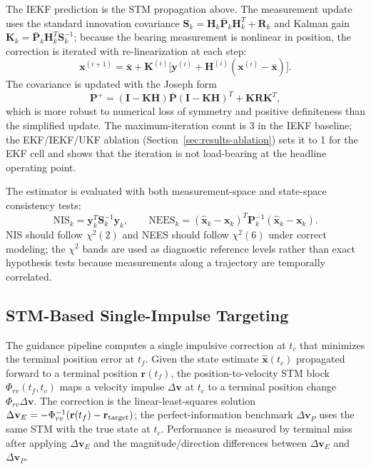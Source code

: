 \documentclass[10pt,twocolumn]{article}
\newcommand{\vect}[1]{\mathbf{#1}}
\newcommand{\mat}[1]{\mathbf{#1}}
\newcommand{\chisq}{\chi^2}
\begin{document}
The IEKF prediction is the STM propagation above.  The measurement update uses the standard innovation covariance $\mat{S}_k=\mat{H}_k\bar{\vect{P}}_k\mat{H}_k^T+\mat{R}_k$ and Kalman gain $\mat{K}_k=\bar{\vect{P}}_k\mat{H}_k^T\mat{S}_k^{-1}$; because the bearing measurement is nonlinear in position, the correction is iterated with re-linearization at each step:
\begin{equation}
\vect{x}^{(i+1)}=\bar{\vect{x}}+\mat{K}^{(i)}\bigl[\vect{y}^{(i)}+\mat{H}^{(i)}(\vect{x}^{(i)}-\bar{\vect{x}})\bigr].
\end{equation}
The covariance is updated with the Joseph form
\begin{equation}
\vect{P}^{+}=(\mat{I}-\mat{K}\mat{H})\bar{\vect{P}}(\mat{I}-\mat{K}\mat{H})^T+\mat{K}\mat{R}\mat{K}^T,
\end{equation}
which is more robust to numerical loss of symmetry and positive definiteness than the simplified update.  The maximum-iteration count is 3 in the IEKF baseline; the EKF/IEKF/UKF ablation (Section~\ref{sec:results-ablation}) sets it to 1 for the EKF cell and shows that the iteration is not load-bearing at the headline operating point.

The estimator is evaluated with both measurement-space and state-space consistency tests:
\begin{equation}
\mathrm{NIS}_k = \vect{y}_k^T\mat{S}_k^{-1}\vect{y}_k,\qquad
\mathrm{NEES}_k=(\hat{\vect{x}}_k-\vect{x}_k)^T\vect{P}_k^{-1}(\hat{\vect{x}}_k-\vect{x}_k).
\end{equation}
NIS should follow $\chisq(2)$ and NEES should follow $\chisq(6)$ under correct modeling; the $\chisq$ bands are used as diagnostic reference levels rather than exact hypothesis tests because measurements along a trajectory are temporally correlated.

\subsection{STM-Based Single-Impulse Targeting}
The guidance pipeline computes a single impulsive correction at $t_c$ that minimizes the terminal position error at $t_f$.  Given the state estimate $\hat{\vect{x}}(t_c)$ propagated forward to a terminal position $\vect{r}(t_f)$, the position-to-velocity STM block $\Phi_{rv}(t_f,t_c)$ maps a velocity impulse $\Delta\vect{v}$ at $t_c$ to a terminal position change $\Phi_{rv}\Delta\vect{v}$.  The correction is the linear-least-squares solution $\Delta\vect{v}_E=-\Phi_{rv}^{-1}(\vect{r}(t_f)-\vect{r}_{\rm target})$; the perfect-information benchmark $\Delta\vect{v}_P$ uses the same STM with the true state at $t_c$.  Performance is measured by terminal miss after applying $\Delta\vect{v}_E$ and the magnitude/direction differences between $\Delta\vect{v}_E$ and $\Delta\vect{v}_P$.
\end{document}
